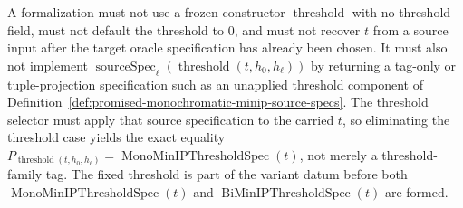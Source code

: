 \begin{definition}
  A formalization must not use a frozen constructor $\operatorname{threshold}$
  with no threshold field, must not default the threshold to $0$, and must not
  recover $t$ from a source input after the target oracle specification has
  already been chosen.  It must also not implement
  $\operatorname{sourceSpec}_{\ell}(\operatorname{threshold}(t,h_0,h_\ell))$
  by returning a tag-only or tuple-projection specification such as an
  unapplied threshold component of
  Definition~\ref{def:promised-monochromatic-minip-source-specs}.  The
  threshold selector must apply that source specification to the carried
  $t$, so eliminating the threshold case yields the exact equality
  $P_{\operatorname{threshold}(t,h_0,h_\ell)}
  =\operatorname{MonoMinIPThresholdSpec}(t)$, not merely a threshold-family
  tag.  The fixed threshold is part of the variant datum before both
  $\operatorname{MonoMinIPThresholdSpec}(t)$ and
  $\operatorname{BiMinIPThresholdSpec}(t)$ are formed.
\end{definition}

